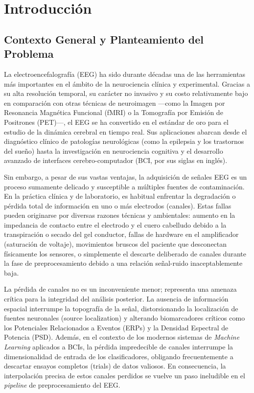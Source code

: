 \chapter{Introducción}

\section{Contexto General y Planteamiento del Problema}

La electroencefalografía (EEG) ha sido durante décadas una de las herramientas más importantes en el ámbito de la neurociencia clínica y experimental. Gracias a su alta resolución temporal, su carácter no invasivo y su costo relativamente bajo en comparación con otras técnicas de neuroimagen —como la Imagen por Resonancia Magnética Funcional (fMRI) o la Tomografía por Emisión de Positrones (PET)—, el EEG se ha convertido en el estándar de oro para el estudio de la dinámica cerebral en tiempo real. Sus aplicaciones abarcan desde el diagnóstico clínico de patologías neurológicas (como la epilepsia y los trastornos del sueño) hasta la investigación en neurociencia cognitiva y el desarrollo avanzado de interfaces cerebro-computador (BCI, por sus siglas en inglés).

Sin embargo, a pesar de sus vastas ventajas, la adquisición de señales EEG es un proceso sumamente delicado y susceptible a múltiples fuentes de contaminación. En la práctica clínica y de laboratorio, es habitual enfrentar la degradación o pérdida total de información en uno o más electrodos (canales). Estas fallas pueden originarse por diversas razones técnicas y ambientales: aumento en la impedancia de contacto entre el electrodo y el cuero cabelludo debido a la transpiración o secado del gel conductor, fallas de hardware en el amplificador (saturación de voltaje), movimientos bruscos del paciente que desconectan físicamente los sensores, o simplemente el descarte deliberado de canales durante la fase de preprocesamiento debido a una relación señal-ruido inaceptablemente baja.

La pérdida de canales no es un inconveniente menor; representa una amenaza crítica para la integridad del análisis posterior. La ausencia de información espacial interrumpe la topografía de la señal, distorsionando la localización de fuentes neuronales (source localization) y alterando biomarcadores críticos como los Potenciales Relacionados a Eventos (ERPs) y la Densidad Espectral de Potencia (PSD). Además, en el contexto de los modernos sistemas de \textit{Machine Learning} aplicados a BCIs, la pérdida impredecible de canales interrumpe la dimensionalidad de entrada de los clasificadores, obligando frecuentemente a descartar ensayos completos (trials) de datos valiosos. En consecuencia, la interpolación precisa de estos canales perdidos se vuelve un paso ineludible en el \textit{pipeline} de preprocesamiento del EEG.

